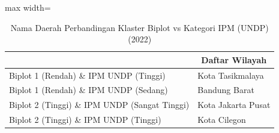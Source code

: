\begin{table}[H]
\centering
\caption{Nama Daerah Perbandingan Klaster Biplot vs Kategori IPM (UNDP) (2022)} \label{tab:sample1crossname2022}
\begin{adjustbox}{max width=\textwidth}
\begin{tabular}{|>{\centering\arraybackslash}p{4cm}|p{10cm}|}
\hline
\multicolumn{1}{|c|}{\textbf{Kategori}} & \multicolumn{1}{c|}{\textbf{Daftar Wilayah}} \\
\hline
Biplot 1 (Rendah) \& IPM UNDP (Tinggi) & Kota Tasikmalaya \\
\hline
Biplot 1 (Rendah) \& IPM UNDP (Sedang) & Bandung Barat \\
\hline
Biplot 2 (Tinggi) \& IPM UNDP (Sangat Tinggi) & Kota Jakarta Pusat \\
\hline
Biplot 2 (Tinggi) \& IPM UNDP (Tinggi) & Kota Cilegon \\
\hline
\end{tabular}
\end{adjustbox}
\end{table}